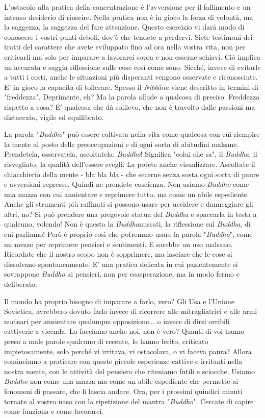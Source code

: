 L'ostacolo alla pratica della concentrazione è l'avversione per il
fallimento e un intenso desiderio di riuscire. Nella pratica non è in
gioco la forza di volontà, ma la saggezza, la saggezza del fare
attenzione. Questo esercizio vi darà modo di conoscere i vostri punti
deboli, dov'è che tendete a perdervi. Siete testimoni dei tratti del
carattere che avete sviluppato fino ad ora nella vostra vita, non per
criticarli ma solo per imparare a lavorarci sopra e non esserne schiavi.
Ciò implica un'accurata e saggia riflessione sulle cose così come sono.
Sicché, invece di evitarle a tutti i costi, anche le situazioni più
disperanti vengono osservate e riconosciute. E' in gioco la capacita di
tollerare. Spesso il \textit{Nibbāna} viene descritto in termini di "freddezza".
Deprimente, eh? Ma la parola allude a qualcosa di preciso. Freddezza
rispetto a cosa? E' qualcosa che dà sollievo, che non è travolto dalle
passioni ma distaccato, vigile ed equilibrato.

La parola "\textit{Buddho}" può essere coltivata nella vita come qualcosa con cui
riempire la mente al posto delle preoccupazioni e di ogni sorta di
abitudini malsane. Prendetela, osservatela, ascoltatela: \textit{Buddho}!
Significa "colui che sa", il \textit{Buddha}, il risvegliato, la qualità
dell'essere svegli. La potete anche visualizzare. Ascoltate il
chiacchierio della mente - bla bla bla - che secerne senza sosta ogni
sorta di paure e avversioni represse. Quindi ne prendete coscienza. Non
usiamo \textit{Buddho} come una mazza con cui annientare e reprimere tutto, ma
come un abile espediente. Anche gli strumenti più raffinati si possono
usare per uccidere e danneggiare gli altri, no? Si può prendere una
pregevole statua del \textit{Buddha} e spaccarla in testa a qualcuno, volendo!
Non è questa la \textit{Buddha}nussati, la riflessione sul \textit{Buddha}, di cui
parliamo! Però è proprio così che potremmo usare la parola "\textit{Buddho}",
come un mezzo per reprimere pensieri e sentimenti. E sarebbe un uso
malsano. Ricordate che il nostro scopo non è sopprimere, ma lasciare che
le cose si dissolvano spontaneamente. E' una pratica delicata in cui
pazientemente si sovrappone \textit{Buddho} ai pensieri, non per esasperazione,
ma in modo fermo e deliberato.

Il mondo ha proprio bisogno di imparare a farlo, vero? Gli Usa e
l'Unione Sovietica, avrebbero dovuto farlo invece di ricorrere alle
mitragliatrici e alle armi nucleari per annientare qualunque
opposizione... o invece di dirsi orribili cattiverie a vicenda. Lo
facciamo anche noi, non è vero? Quanti di voi hanno preso a male parole
qualcuno di recente, lo hanno ferito, criticato impietosamente, solo
perché vi irritava, vi ostacolava, o vi faceva paura? Allora cominciamo
a praticare con queste piccole esperienze cattive e irritanti nella
nostra mente, con le attività del pensiero che riteniamo futili e
sciocche. Usiamo \textit{Buddho} non come una mazza ma come un abile espediente
che permette ai fenomeni di passare, che li lascia andare. Ora, per i
prossimi quindici minuti tornate al vostro naso con la ripetizione del
mantra "\textit{Buddho}". Cercate di capire come funziona e come lavorarci.

